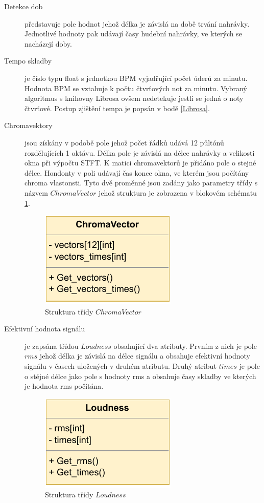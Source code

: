\begin{description}
    \item[Detekce dob] představuje pole hodnot jehož délka je závislá na době trvání nahrávky. Jednotlivé hodnoty pak udávají časy hudební nahrávky, ve kterých se nacházejí doby.
    \item[Tempo skladby] je číslo typu float s jednotkou \acs{BPM} vyjadřující počet úderů za minutu. Hodnota BPM se vztahuje k počtu čtvrťových not za minutu. Vybraný algoritmus s knihovny Librosa ovšem nedetekuje jestli se jedná o noty čtvrťové. Postup zjištění tempa je popsán v bodě \ref{Librosa}.
    \item[Chromavektory] jsou získány v podobě pole jehož počet řádků udává 12 půltónů rozdělujících 1 oktávu. Délka pole je závislá na délce nahrávky a velikosti okna  při výpočtu \acs{STFT}. K matici chromavektorů je přidáno pole o stejné délce. Hondonty v poli udávají čas konce okna, ve kterém jsou počítány chroma vlastonsti. Tyto dvě proměnné jsou zadány jako parametry třídy s názvem $ChromaVector$ jehož struktura je zobrazena v blokovém schématu \ref{fig:ChromaVector_class_diagram}.

    \begin{figure}[H]
        \centering
        \includegraphics[width = 0.3\linewidth]{obrazky/UML_diagram_ChromaVector.pdf}
        \caption{Struktura třídy $ChromaVector$}
        \label{fig:ChromaVector_class_diagram}
    \end{figure}

    \item[Efektivní hodnota signálu] je zapsána třídou $Loudness$ obsahující dva atributy. Prvním z nich je pole $rms$ jehož délka je závislá na délce signálu a obsahuje efektivní hodnoty signálu v časech uložených v druhém atributu. Druhý atribut $times$ je pole o stéjné délce jako pole s hodnoty rms a obsahuje časy skladby ve kterých je hodnota rms počítána. 
    
    \begin{figure}[H]
        \centering
        \includegraphics[width = 0.3\linewidth]{obrazky/UML_diagram_Loudness.pdf}
        \caption{Struktura třídy $Loudness$}
        \label{fig:Loudness_class_diagram}
    \end{figure}


\end{description}
